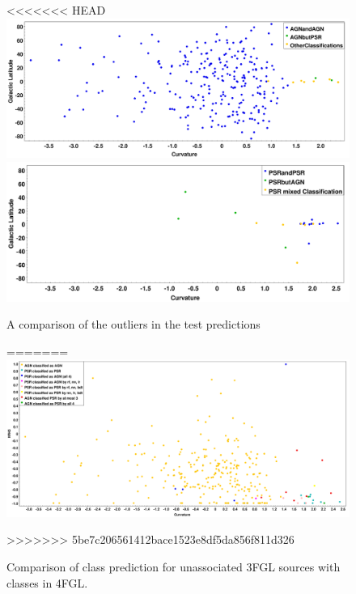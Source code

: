 \begin{figure}[h]
<<<<<<< HEAD
\includegraphics[width=\twopicsp\textwidth]{plots/AGN.pdf}
\includegraphics[width=\twopicsp\textwidth]{plots/PSR3.pdf}
\caption{A comparison of the outliers in the test predictions}
=======
\includegraphics[width=\twopicsp\textwidth]{plots/final_catalog.pdf}
\caption{Comparison of class prediction for unassociated 3FGL sources with classes in 4FGL. 
}
>>>>>>> 5be7c206561412bace1523e8df5da856f811d326
\label{fig:Maps_data}
\end{figure}
